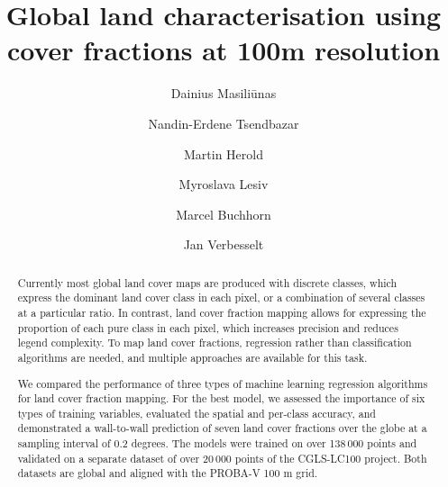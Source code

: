 \documentclass[review,authoryear,3p]{elsarticle}
\begin{document}
\begin{frontmatter} %

\title{Global land characterisation using cover fractions at 100m resolution}

\author[WURGRS]{Dainius Masiliūnas}

\author[WURGRS]{Nandin-Erdene Tsendbazar}

\author[WURGRS]{Martin Herold}

\author[IIASA]{Myroslava Lesiv}

\author[VITO]{Marcel Buchhorn}

\author[WURGRS]{Jan Verbesselt}

\address[WURGRS]{Wageningen University \& Research, Laboratory of Geo-Information Science and Remote Sensing, Droevendaalsesteeg 3, 6708 PB Wageningen, the Netherlands}
\address[IIASA]{International Institute for Applied Systems Analysis (IIASA), Schlossplatz 1, A-2361 Laxenburg, Austria}
\address[VITO]{Flemish Institute for Technological Research (VITO), Boeretang 200, BE-2400 Mol, Belgium}

\begin{abstract} %
Currently most global land cover maps are produced with discrete classes, which express the dominant land cover class in each pixel, or a combination of several classes at a particular ratio. In contrast, land cover fraction mapping allows for expressing the proportion of each pure class in each pixel, which increases precision and reduces legend complexity. To map land cover fractions, regression rather than classification algorithms are needed, and multiple approaches are available for this task.

We compared the performance of three types of machine learning regression algorithms for land cover fraction mapping.
For the best model, we assessed the importance of six types of training variables, evaluated the spatial and per-class accuracy, and demonstrated a wall-to-wall prediction of seven land cover fractions over the globe at a sampling interval of 0.2 degrees.
The models were trained on over 138\,000 points and validated on a separate dataset of over 20\,000 points of the \gls{CGLS-LC100} project. Both datasets are global and aligned with the PROBA-V 100 m grid.


\end{abstract}
\end{frontmatter}
\end{document}
